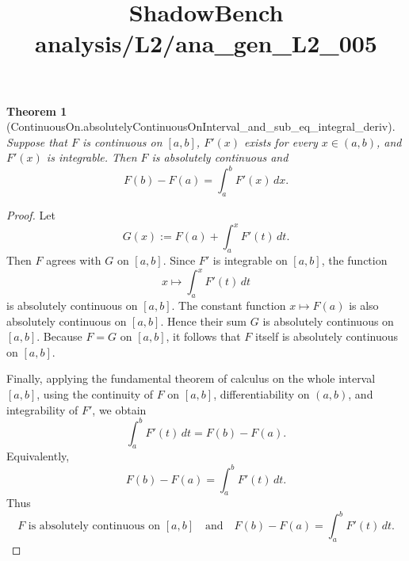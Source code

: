 \documentclass{article}
\title{ShadowBench analysis/L2/ana\_gen\_L2\_005}
\newtheorem{theorem}{Theorem}
\begin{document}
\maketitle

\begin{theorem}[ContinuousOn.absolutelyContinuousOnInterval_and_sub_eq_integral_deriv]
Suppose that $F$ is continuous on $[a,b]$, $F'(x)$ exists for every $x \in (a,b)$, and $F'(x)$ is integrable. Then $F$ is absolutely continuous and
\[
F(b) - F(a) = \int_a^b F'(x)\,dx.
\]
\end{theorem}

\begin{proof}
Let
\[
  G(x) := F(a) + \int_a^x F'(t)\,dt .
\]
Then $F$ agrees with $G$ on $[a,b]$.  
Since $F'$ is integrable on $[a,b]$, the function
\[
  x\mapsto \int_a^x F'(t)\,dt
\]
is absolutely continuous on $[a,b]$. The constant function
$x\mapsto F(a)$ is also absolutely continuous on $[a,b]$. Hence their sum
$G$ is absolutely continuous on $[a,b]$.
Because $F=G$ on $[a,b]$, it follows that $F$ itself is absolutely
continuous on $[a,b]$.

Finally, applying the fundamental theorem of calculus on the whole interval
$[a,b]$, using the continuity of $F$ on $[a,b]$, differentiability on
$(a,b)$, and integrability of $F'$, we obtain
\[
  \int_a^b F'(t)\,dt = F(b)-F(a).
\]
Equivalently,
\[
  F(b)-F(a)=\int_a^b F'(t)\,dt .
\]
Thus
\[
  F \text{ is absolutely continuous on } [a,b]
  \quad\text{and}\quad
  F(b)-F(a)=\int_a^b F'(t)\,dt .
\]
\end{proof}
\end{document}
